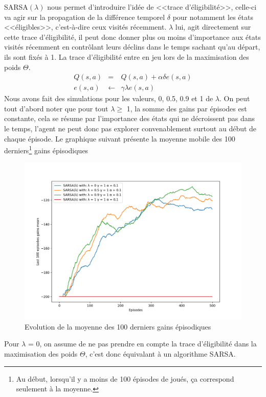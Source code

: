 \documentclass[letterpaper,11pt]{article}
\begin{document}
\begin{enumerate}[label=(\alph*)]
SARSA$(\lambda)$ nous permet d'introduire l'idée de <<trace d'éligibilité>>, celle-ci va agir sur la propagation de la différence temporel $\delta$ pour notamment les états <<éligibles>>, c'est-à-dire ceux visités récemment.
$\lambda$ lui, agit directement sur cette trace d'éligibilité, il peut donc donner plus ou moins d'importance aux états visités récemment en contrôlant leurs déclins dans le temps sachant qu'au départ, ils sont fixés à 1.
La trace d'éligibilité entre en jeu lors de la maximisation des poids $\Theta$.
\begin{eqnarray*}
Q(s,a) & = & Q(s,a) + \alpha \delta e(s,a) \\
e(s,a) & \leftarrow &  \gamma \lambda e(s,a)
\end{eqnarray*}
Nous avons fait des simulations pour les valeurs, 0, 0.5, 0.9 et 1 de $\lambda$. On peut tout d'abord noter que pour tout $\lambda \geq$ 1, la somme des gains par épisodes est constante, cela se résume par l'importance des états qui ne décroissent pas dans le temps, l'agent ne peut donc pas explorer convenablement surtout au début de chaque épisode. Le graphique suivant présente la moyenne mobile des 100 derniers\footnote{Au début, lorsqu'il y a moins de 100 épisodes de joués, ça correspond seulement à la moyenne.} gains épisodiques 
\begin{figure}[H]
\label{figure: variance petite}
\caption{Evolution de la moyenne des 100 derniers gains épisodiques}
\begin{center}
\includegraphics[scale=0.45]{SARSA_lambda_gains.png}
\end{center}
\end{figure}
Pour $\lambda$ = 0, on assume de ne pas prendre en compte la trace d'éligibilité dans la maximisation des poids $\Theta$, c'est donc équivalant à un algorithme SARSA.\\


\end{enumerate}
\end{document}
